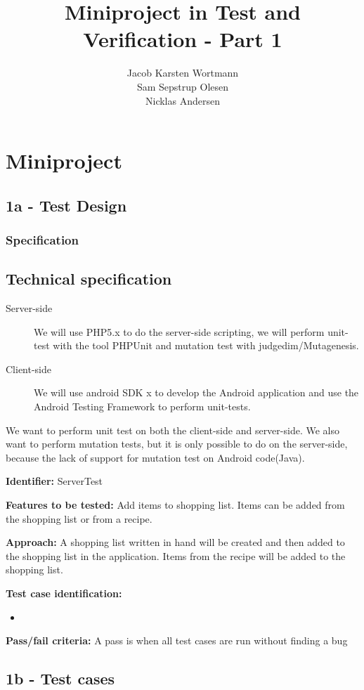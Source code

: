 \documentclass[a4paper,12pt]{memoir}
\title{Miniproject in Test and Verification - Part 1}
\author{Jacob Karsten Wortmann\\Sam Sepstrup Olesen\\Nicklas Andersen}
\newcommand{\testdesign}[5]
{
\begin{framed}
\begin{description}
\item \textbf{Identifier:} #1
\item \textbf{Features to be tested:} #2
\item \textbf{Approach:} #3
\item \textbf{Test case identification:} #4
\item \textbf{Pass/fail criteria:} #5
\end{description}
\end{framed}
}
\begin{document}
\maketitle
\chapter*{Miniproject}
\section*{1a - Test Design}
\subsection*{Specification}
\section{Technical specification}
\begin{description}
    \item[Server-side]
        We will use PHP5.x to do the server-side scripting,
        we will perform unit-test with the tool PHPUnit and mutation test with judgedim/Mutagenesis.
    \item[Client-side]
        We will use android SDK x to develop the Android application and use the Android Testing Framework to perform unit-tests.
\end{description}
We want to perform unit test on both the client-side and server-side. We also want to perform mutation tests, but it is only possible to do on the server-side, because the lack of support for mutation test on Android code(Java).


\testdesign
{ServerTest}
{Add items to shopping list. Items can be added from the shopping list or from a recipe.}
{A shopping list written in hand will be created and then added to the shopping list in the application. Items from the recipe will be added to the shopping list.}
{\begin{itemize}[nolistsep]
\item
\end{itemize}}
{A pass is when all test cases are run without finding a bug}

\section*{1b - Test cases}
\end{document}
